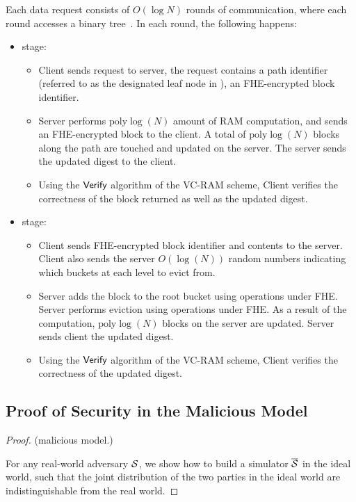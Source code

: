 {Each data request consists of $O(\log N)$ rounds of communication, where each round accesses
a binary tree~\cite{asiacrypt11}.
In each round, the following happens:
\begin{itemize}
\item
\rr stage:
\begin{itemize}
\item
Client sends request to server, the request contains a path identifier (referred to
as the designated leaf node in \cite{asiacrpt11}),
an FHE-encrypted block identifier.
\item
Server performs $\text{poly} \log(N)$ amount of RAM computation,
and sends an FHE-encrypted block to the client.
A total of $\text{poly} \log(N)$ blocks along the path are touched and updated on the server.
The server sends the updated digest to the client.
\item
Using the $\mathsf{Verify}$ algorithm of the VC-RAM scheme, Client verifies the
correctness of the block returned as well as the updated digest.
\end{itemize}
\item
\add stage:
\begin{itemize}
\item
Client sends FHE-encrypted block identifier and contents to the server.
Client also sends the server $O(\log(N))$ random numbers indicating which buckets
at each level to evict from.
\item
Server adds the block to the root bucket using operations under FHE.
Server performs eviction using operations under FHE.
As a result of the computation, $\text{poly} \log(N)$ blocks on the server
are updated.
Server sends client the updated digest.
\item
Using the $\mathsf{Verify}$ algorithm of the VC-RAM scheme, Client verifies the
correctness of the updated digest.
\end{itemize}
\end{itemize}



\subsection{Proof of Security in the Malicious Model}

\begin{proof}(malicious model.)

For any real-world adversary $\mathcal{S}$, we show how to build a simulator $\overline{\mathcal{S}}$ in the ideal world,
such that the joint distribution of the two parties in the ideal world are indistinguishable
from the real world.



\end{proof}}
